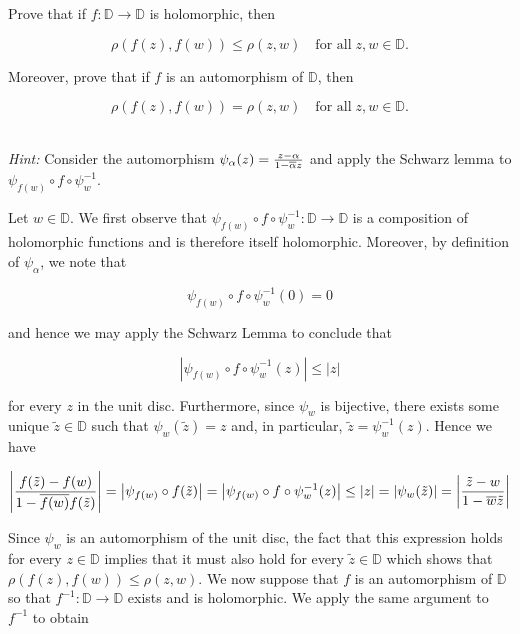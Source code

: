 Prove that if $f:\mathbb{D} \to \mathbb{D}$ is holomorphic, then

$$
\rho(f(z), f(w)) \le \rho(z, w) \quad \text{for all} \; z, w \in \mathbb{D}.
$$

Moreover, prove that if $f$ is an automorphism of $\mathbb{D}$, then 

$$
\rho(f(z), f(w)) = \rho(z, w) \quad \text{for all} \; z, w \in \mathbb{D}.
$$

\ \\
\textit{Hint: } Consider the automorphism $\psi_{\alpha}(z) = \frac{z - \alpha}{1 - \overline{\alpha}{z}}$ and apply the 
Schwarz lemma to $\psi_{f(w)} \circ f \circ \psi_{w}^{-1}$.

\begin{solution}
  Let $w \in \mathbb{D}$. We first observe that $\psi_{f(w)} \circ f \circ \psi_{w}^{-1}: \mathbb{D} \to \mathbb{D}$ is 
  a composition of holomorphic functions and is therefore itself holomorphic. Moreover, by definition of 
  $\psi_{\alpha}$, we note that

  $$
  \psi_{f(w)} \circ f \circ \psi_{w}^{-1} (0) = 0
  $$

  and hence we may apply the Schwarz Lemma to conclude that

  $$
  \left| \psi_{f(w)} \circ f \circ \psi_{w}^{-1} (z) \right| \le |z|
  $$

  for every $z$ in the unit disc. Furthermore, since $\psi_w$ is bijective, there exists some unique 
  $\tilde{z} \in \mathbb{D}$ such that $\psi_w(\tilde{z}) = z$ and, in particular, $\tilde{z} = \psi_w^{-1}(z)$. Hence 
  we have

  $$
  \left| \frac{f(\tilde{z}) - f(w)}{1 - \overline{f(w)}f(\tilde{z})} \right| = \left| \psi_{f(w)} \circ f (\tilde{z}) \right| 
                                                                         = \left| \psi_{f(w)} \circ f \circ \psi_w^{-1}(z) \right| 
                                                                         \le |z| 
                                                                         = |\psi_w (\tilde{z})| 
                                                                         = \left| \frac{\tilde{z} - w}{1 - \overline{w} \tilde{z}} \right|
  $$

  Since $\psi_w$ is an automorphism of the unit disc, the fact that this expression holds for every $z \in \mathbb{D}$ 
  implies that it must also hold for every $\tilde{z} \in \mathbb{D}$ which shows that 
  $\rho(f(z), f(w)) \le \rho(z, w)$. We now suppose that $f$ is an automorphism of $\mathbb{D}$ so that 
  $f^{-1}:\mathbb{D} \to \mathbb{D}$ exists and is holomorphic. We apply the same argument to $f^{-1}$ to obtain


\end{solution}
